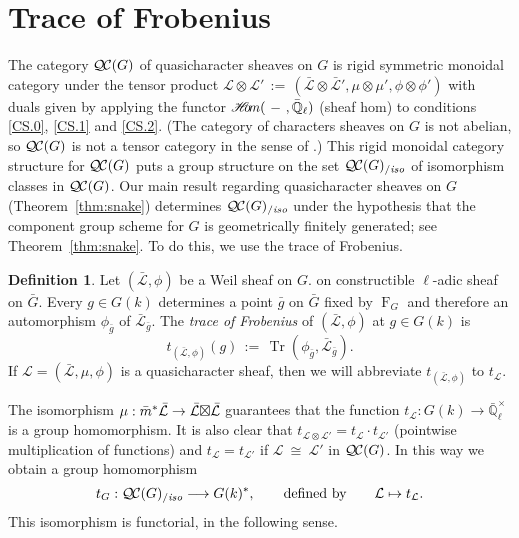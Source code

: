 \documentclass[11pt]{amsart}
\theoremstyle{plain}
\newtheorem{proposition}[theorem]{Proposition}
\theoremstyle{definition}
\newtheorem{definition}[theorem]{Definition}
\theoremstyle{remark}
\newcommand{\EE}{\mathbb{\bar Q}_\ell}
\newcommand{\Fq}{k}
\newcommand{\EEx}{\EE^\times}
\newcommand{\Frob}[1]{\operatorname{F}_{#1}}
\DeclareMathOperator{\trace}{Tr}
\newcommand{\cdef}[1]{ {#1}\index{#1} }
\newcommand{\sheafHom}{{\mathscr{H}\hskip-4pt{\it o}\hskip-2pt{\it m}}}
\newcommand{\ceq}{{\, :=\, }}
\newcommand{\iso}{{\ \cong\ }}
\newcommand{\cs}[1]{{\mathcal{#1}}}
\newcommand{\gcs}[1]{{\mathcal{\bar #1}}}
\newcommand{\QC}{{\mathcal{Q\hskip-0.8pt C}}}
\newcommand{\QCiso}[1]{\QC(#1)_{/\textit{iso}}}
\newcommand{\trFrob}[1]{t_{#1}}
\newcommand{\bg}{\bar{g}}
\newcommand{\bm}{\bar{m}}
\newcommand{\bG}{\bar{G}}
\newcommand{\tight}[3]{\hspace{-#1pt}{#2}\hspace{-#3pt}}
\newcommand{\LxL}{\text{$\gcs{L} \tight{0}{\boxtimes}{0} \gcs{L}$}}
\begin{document}
\section{Trace of Frobenius}\label{sec:Frob}

The category $\QC(G)$ of quasicharacter sheaves on $G$ is rigid symmetric monoidal category \cite{etingof:09a} under the tensor product
$\cs{L} \otimes \cs{L'} \ceq (\gcs{L}\otimes\gcs{L'}, \mu\otimes\mu', \phi\otimes \phi')$
with duals given by applying the functor 
$\sheafHom(\ - \ ,\EE)$ (sheaf hom) to
conditions \ref{CS.0}, \ref{CS.1} and \ref{CS.2}.
(The category of characters sheaves on $G$ is not abelian, so $\QC(G)$
is not a tensor category in the sense of \cite{deligne:02a}.)
%
This rigid monoidal category structure for $\QC(G)$ puts a group
structure on the set $\QCiso{G}$ of isomorphism classes in
$\QC(G)$. Our main result regarding quasicharacter sheaves on $G$ (Theorem~\ref{thm:snake})
determines $\QCiso{G}$ under the hypothesis that the component group scheme for $G$ is geometrically finitely generated; see Theorem~\ref{thm:snake}. To do this, we use the trace of Frobenius.

\begin{definition}\label{def:trFrob}
Let $(\gcs{L},\phi)$ be a Weil sheaf on $G$. on constructible $\ell$-adic sheaf on $\bG$. Every $g\in G(\Fq)$
determines a point $\bg$ on $\bG$ fixed by $\Frob{G}$ and
therefore an automorphism $\phi_{\bg}$ of $\gcs{L}_{\bg}$. The \emph{trace of Frobenius} of $(\gcs{L},\phi)$ at $g\in G(\Fq)$ is 
\[
\trFrob{(\gcs{L},\phi)}(g) \ceq \trace(\phi_{\bg}, \gcs{L}_{\bg}).
\]
If $\cs{L} = (\gcs{L},\mu,\phi)$ is a quasicharacter sheaf, 
then we will abbreviate $\trFrob{(\gcs{L},\phi)}$ to $\trFrob{\cs{L}}$.
\end{definition}

The isomorphism $\mu : \bm^* \gcs{L} \to \LxL$ guarantees 
that the function $\trFrob{\cs{L}} : G(\Fq)\to \EEx$ is a group homomorphism.
It is also clear that $\trFrob{\cs{L}\otimes \cs{L'}} = \trFrob{\cs{L}} \cdot \trFrob{\cs{L'}}$
(pointwise multiplication of functions) and $\trFrob{\cs{L}} = \trFrob{\cs{L'}}$
if $\cs{L} \iso \cs{L'}$ in $\QC(G)$. In this way we obtain a group homomorphism
\[
\cdef{\trFrob{G}} : \QCiso{G} \longrightarrow G(\Fq)^*,
\qquad \text{defined by}\qquad \cs{L} \mapsto \trFrob{\cs{L}}.
\]
This isomorphism is functorial, in the following sense.
\end{document}
